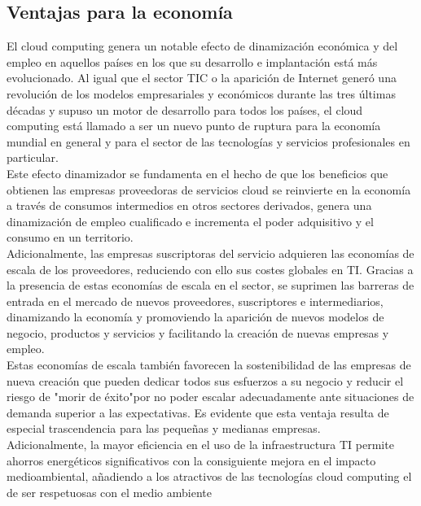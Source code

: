 \documentclass[a4paper, 12pt]{report}
\begin{document}
\subsection{Ventajas para la econom\'ia}
\begin{justify}
El cloud computing genera un notable efecto de dinamizaci\'on econ\'omica y del empleo en aquellos pa\'ises en los que su desarrollo e implantaci\'on est\'a m\'as evolucionado. Al igual que el sector TIC o la aparici\'on de Internet gener\'o una revoluci\'on de los modelos empresariales y econ\'omicos durante las tres \'ultimas d\'ecadas y supuso un motor de desarrollo para todos los pa\'ises, el cloud computing est\'a llamado a ser un nuevo punto de ruptura para la econom\'ia mundial en general y para el sector de las tecnolog\'ias y servicios profesionales en particular.
\\ Este efecto dinamizador se fundamenta en el hecho de que los beneficios que obtienen las empresas proveedoras de servicios cloud se reinvierte en la econom\'ia a trav\'es de consumos intermedios en otros sectores derivados, genera una dinamizaci\'on de empleo cualificado e incrementa el poder adquisitivo y el consumo en un territorio. 
\\ Adicionalmente, las empresas suscriptoras del servicio adquieren las econom\'ias de escala de los proveedores, reduciendo con ello sus costes globales en TI. Gracias a la presencia de estas econom\'ias de escala en el sector, se suprimen las barreras de entrada en el mercado de nuevos proveedores, suscriptores e intermediarios, dinamizando la econom\'ia y promoviendo la aparición de nuevos modelos de negocio, productos y servicios y facilitando la creación de nuevas empresas y empleo.
\\ Estas econom\'ias de escala también favorecen la sostenibilidad de las empresas de nueva creación que pueden dedicar todos sus esfuerzos a su negocio y reducir el riesgo de "morir de \'exito"\hspace{0.1cm}por no poder escalar adecuadamente ante situaciones de demanda superior a las expectativas. Es evidente que esta ventaja resulta de especial trascendencia para las pequeñas y medianas empresas.
\\ Adicionalmente, la mayor eficiencia en el uso de la infraestructura TI permite ahorros energ\'eticos significativos con la consiguiente mejora en el impacto medioambiental, añadiendo a los atractivos de las tecnolog\'ias cloud computing el de ser respetuosas con el medio ambiente

\end{justify}
\newpage
\end{document}
